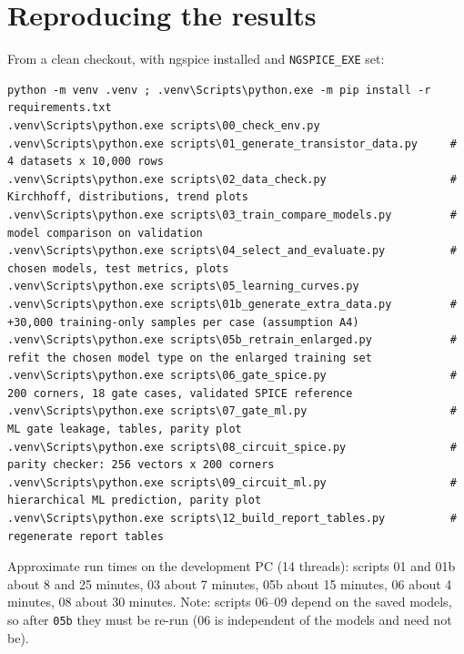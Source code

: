 \section{Reproducing the results}
From a clean checkout, with ngspice installed and \texttt{NGSPICE\_EXE} set:
\begin{verbatim}
python -m venv .venv ; .venv\Scripts\python.exe -m pip install -r requirements.txt
.venv\Scripts\python.exe scripts\00_check_env.py
.venv\Scripts\python.exe scripts\01_generate_transistor_data.py     # 4 datasets x 10,000 rows
.venv\Scripts\python.exe scripts\02_data_check.py                   # Kirchhoff, distributions, trend plots
.venv\Scripts\python.exe scripts\03_train_compare_models.py         # model comparison on validation
.venv\Scripts\python.exe scripts\04_select_and_evaluate.py          # chosen models, test metrics, plots
.venv\Scripts\python.exe scripts\05_learning_curves.py
.venv\Scripts\python.exe scripts\01b_generate_extra_data.py         # +30,000 training-only samples per case (assumption A4)
.venv\Scripts\python.exe scripts\05b_retrain_enlarged.py            # refit the chosen model type on the enlarged training set
.venv\Scripts\python.exe scripts\06_gate_spice.py                   # 200 corners, 18 gate cases, validated SPICE reference
.venv\Scripts\python.exe scripts\07_gate_ml.py                      # ML gate leakage, tables, parity plot
.venv\Scripts\python.exe scripts\08_circuit_spice.py                # parity checker: 256 vectors x 200 corners
.venv\Scripts\python.exe scripts\09_circuit_ml.py                   # hierarchical ML prediction, parity plot
.venv\Scripts\python.exe scripts\12_build_report_tables.py          # regenerate report tables
\end{verbatim}
Approximate run times on the development PC (14 threads): scripts 01 and 01b about 8 and 25 minutes, 03 about 7 minutes, 05b about 15 minutes, 06 about 4 minutes, 08 about 30 minutes.
Note: scripts 06--09 depend on the saved models, so after \texttt{05b} they must be re-run (06 is independent of the models and need not be).
